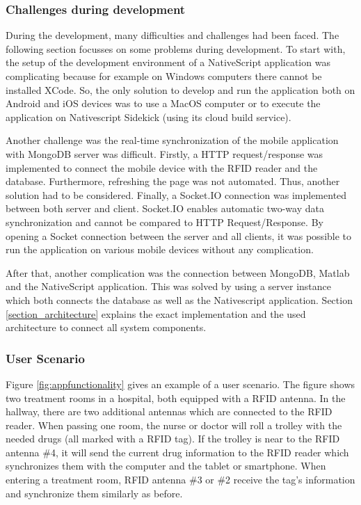 \subsubsection{Challenges during development} \label{challenge}

During the development, many difficulties and challenges had been faced. The following section focusses on some problems during development.
To start with, the setup of the development environment of a NativeScript application was complicating because for example on Windows computers there cannot be installed XCode. So, the only solution to develop and run the application both on Android and iOS devices was to use a MacOS computer or to execute the application on Nativescript Sidekick (using its cloud build service).  

Another challenge was the real-time synchronization of the mobile application with MongoDB server was difficult. Firstly, a HTTP request/response was implemented to connect the mobile device with the RFID reader and the database. Furthermore, refreshing the page was not automated. Thus, another solution had to be considered. Finally, a Socket.IO connection was implemented between both server and client. Socket.IO enables automatic two-way data synchronization and cannot be compared to HTTP Request/Response. By opening a Socket connection between the server and all clients, it was possible to run the application on various mobile devices without any complication. 

After that, another complication was the connection between MongoDB, Matlab and the NativeScript application. This was solved by using a server instance which both connects the database as well as the Nativescript application. Section \ref{section_architecture} explains the exact implementation and the used architecture to connect all system components. 

\subsubsection{User Scenario}

Figure \ref{fig:appfunctionality} gives an example of a user scenario. The figure shows two treatment rooms in a hospital, both equipped with a RFID antenna. In the hallway, there are two additional antennas which are connected to the RFID reader. When passing one room, the nurse or doctor will roll a trolley with the needed drugs (all marked with a RFID tag). If the trolley is near to the RFID antenna \#4, it will send the current drug information to the RFID reader which synchronizes them with the computer and the tablet or smartphone. When entering a treatment room, RFID antenna \#3 or \#2 receive the tag's information and synchronize them similarly as before.

